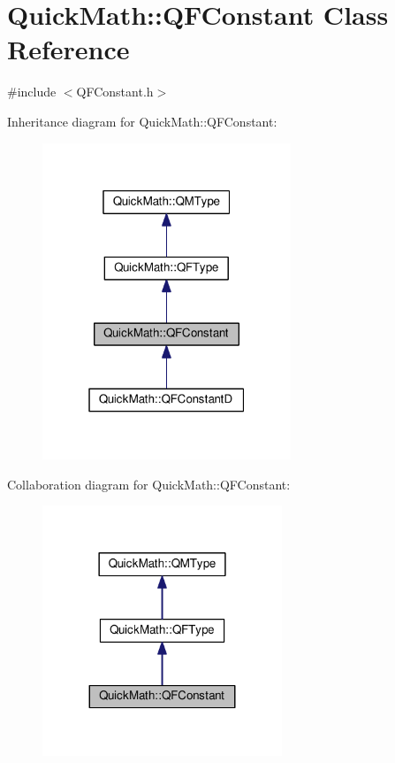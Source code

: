 \hypertarget{classQuickMath_1_1QFConstant}{}\section{Quick\+Math\+:\+:Q\+F\+Constant Class Reference}
\label{classQuickMath_1_1QFConstant}


{\ttfamily \#include $<$Q\+F\+Constant.\+h$>$}



Inheritance diagram for Quick\+Math\+:\+:Q\+F\+Constant\+:
\nopagebreak
\begin{figure}[H]
\begin{center}
\leavevmode
\includegraphics[width=211pt]{classQuickMath_1_1QFConstant__inherit__graph}
\end{center}
\end{figure}


Collaboration diagram for Quick\+Math\+:\+:Q\+F\+Constant\+:
\nopagebreak
\begin{figure}[H]
\begin{center}
\leavevmode
\includegraphics[width=203pt]{classQuickMath_1_1QFConstant__coll__graph}
\end{center}
\end{figure}
